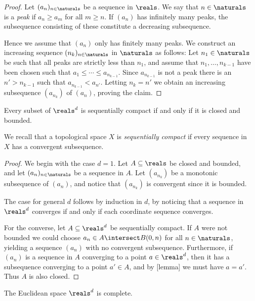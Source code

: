 \documentclass[article, a4paper, 11pt, oneside]{memoir}
\numberwithin{equation}{chapter}
\begin{document}
\begin{proof}
    Let $(a_n)_{n\in\naturals}$ be a sequence in $\reals$. We say that $n \in \naturals$ is a \emph{peak} if $a_n \geq a_m$ for all $m \geq n$. If $(a_n)$ has infinitely many peaks, the subsequence consisting of these constitute a decreasing subsequence.

    Hence we assume that $(a_n)$ only has finitely many peaks. We construct an increasing sequence $(n_k)_{n\in\naturals}$ in $\naturals$ as follows: Let $n_1 \in \naturals$ be such that all peaks are strictly less than $n_1$, and assume that $n_1, \ldots, n_{k-1}$ have been chosen such that $a_1 \leq \cdots \leq a_{n_{k-1}}$. Since $a_{n_{k-1}}$ is not a peak there is an $n' > n_{k-1}$ such that $a_{n_{k-1}} < a_{n'}$. Letting $n_k = n'$ we obtain an increasing subsequence $(a_{n_k})$ of $(a_n)$, proving the claim.
\end{proof}

\begin{theorem}
    Every subset of $\reals^d$ is sequentially compact if and only if it is closed and bounded.
\end{theorem}
%
We recall that a topological space $X$ is \emph{sequentially compact} if every sequence in $X$ has a convergent subsequence.

\begin{proof}
    We begin with the case $d = 1$. Let $A \subseteq \reals$ be closed and bounded, and let $(a_n)_{n\in\naturals}$ be a sequence in $A$. Let $(a_{n_k})$ be a monotonic subsequence of $(a_n)$, and notice that $(a_{n_k})$ is convergent since it is bounded.

    The case for general $d$ follows by induction in $d$, by noticing that a sequence in $\reals^d$ converges if and only if each coordinate sequence converges.

    For the converse, let $A \subseteq \reals^d$ be sequentially compact. If $A$ were not bounded we could choose $a_n \in A \intersect B(0,n)$ for all $n \in \naturals$, yielding a sequence $(a_n)$ with no convergent subsequence. Furthermore, if $(a_n)$ is a sequence in $A$ converging to a point $a \in \reals^d$, then it has a subsequence converging to a point $a' \in A$, and by [lemma] we must have $a = a'$. Thus $A$ is also closed.
\end{proof}


\begin{theorem}
    The Euclidean space $\reals^d$ is complete.
\end{theorem}
\end{document}
